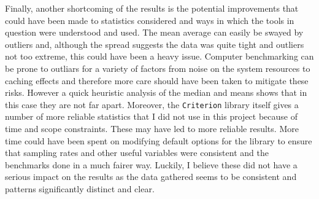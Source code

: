 Finally, another shortcoming of the results is the potential improvements that
could have been made to statistics considered and ways in which the tools in
question were understood and used. The mean average can easily be swayed by
outliers and, although the spread suggests the data was quite tight and
outliers not too extreme, this could have been a heavy issue. Computer
benchmarking can be prone to outliars for a variety of factors from noise on the
system resources to caching effects and therefore more care should have been
taken to mitigate these risks. However a quick heuristic analysis of the median
and means shows that in this case they are not far apart. Moreover, the
\verb|Criterion| library itself gives a number of more reliable statistics that
I did not use in this project because of time and scope constraints. These may
have led to more reliable results. More time could have been spent on modifying
default options for the library to ensure that sampling rates and other useful
variables were consistent and the benchmarks done in a much fairer way. Luckily,
I believe these did not have a serious impact on the results as the data
gathered seems to be consistent and patterns significantly distinct and clear.

